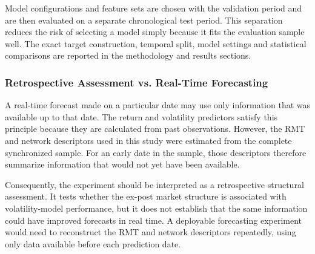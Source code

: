 Model configurations and feature sets are chosen with the validation period and are then evaluated on a separate chronological test period. This separation reduces the risk of selecting a model simply because it fits the evaluation sample well. The exact target construction, temporal split, model settings and statistical comparisons are reported in the methodology and results sections.

\subsubsection{Retrospective Assessment vs. Real-Time Forecasting}
A real-time forecast made on a particular date may use only information that was available up to that date. The return and volatility predictors satisfy this principle because they are calculated from past observations. However, the RMT and network descriptors used in this study were estimated from the complete synchronized sample. For an early date in the sample, those descriptors therefore summarize information that would not yet have been available.

Consequently, the experiment should be interpreted as a retrospective structural assessment. It tests whether the ex-post market structure is associated with volatility-model performance, but it does not establish that the same information could have improved forecasts in real time. A deployable forecasting experiment would need to reconstruct the RMT and network descriptors repeatedly, using only data available before each prediction date.
